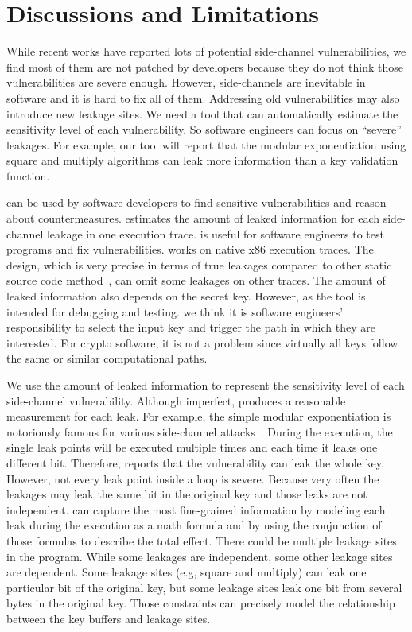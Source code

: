 \section{Discussions and Limitations}
While recent works have reported lots
of potential side-channel vulnerabilities, we find most of them are not patched by
developers because they do not think those vulnerabilities are severe enough.
However, side-channels are inevitable in software and it is hard to fix all of them. 
Addressing old vulnerabilities may also introduce new leakage
sites. We need a
tool that can automatically estimate the sensitivity level of each vulnerability.
So software engineers can focus on
``severe'' leakages. For example, our tool will report that 
the modular exponentiation using square and multiply algorithms can
leak more information than a key validation function.

\tool{} can be used by software developers to find sensitive vulnerabilities
and reason about countermeasures.
\tool{} estimates the amount of leaked information for each side-channel leakage
in one execution trace. \tool{} is useful for software
engineers to test programs and fix vulnerabilities.
\tool{} works on native x86 execution traces. The design, which is very
precise in terms of true leakages compared to other static source code
method~\cite{197207,BacelarAlmeida:2013:FVS:2483313.2483334}, can omit some
leakages on other traces. The amount of leaked information also depends on the secret key.
However, as the tool is intended for debugging and testing.
we think it is software engineers' responsibility to select the input key and trigger the 
path in which they are interested. For crypto software, it is not  
a problem since virtually all keys follow the same or similar computational paths.

We use the amount of leaked information to represent the sensitivity level of each
side-channel vulnerability. Although imperfect, \tool{} produces a reasonable
measurement for each leak. For example, the simple modular exponentiation is notoriously
famous for various side-channel attacks~\cite{kocher1996timing}. During the execution, the single 
leak points will be executed multiple times and each time it leaks one different bit.
Therefore, \tool{} reports that the vulnerability can leak the whole key. However, not every
leak point inside a loop is severe. Because very often the leakages may leak the same
bit in the original key and those leaks are not independent. \tool{} can capture the most 
fine-grained information by modeling each leak during the execution 
as a math formula and by using the conjunction of those formulas to describe the total effect.
There could be multiple leakage sites in the program. While some leakages are independent,
some other leakage sites are dependent. Some leakage sites (e.g, square and multiply) can leak one particular bit 
of the original key, but some leakage sites leak one bit from several bytes in the original
key. Those constraints can precisely model the relationship between the key buffers
and leakage sites.

